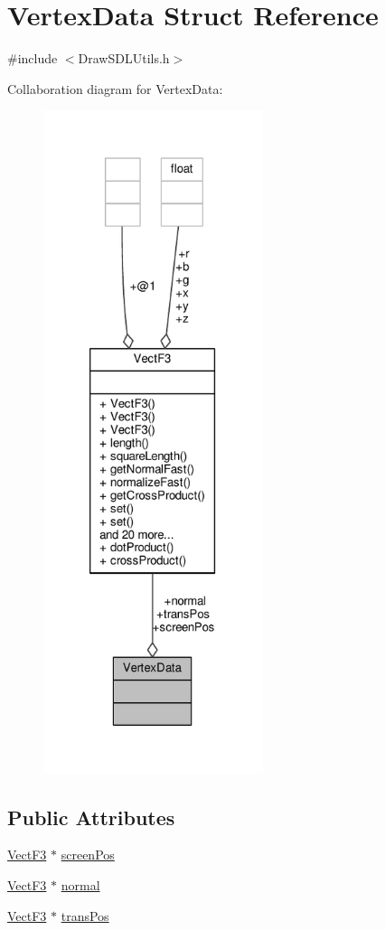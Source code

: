 \hypertarget{structVertexData}{\section{Vertex\-Data Struct Reference}
\label{structVertexData}
}


{\ttfamily \#include $<$Draw\-S\-D\-L\-Utils.\-h$>$}



Collaboration diagram for Vertex\-Data\-:
\nopagebreak
\begin{figure}[H]
\begin{center}
\leavevmode
\includegraphics[height=550pt]{structVertexData__coll__graph}
\end{center}
\end{figure}
\subsection*{Public Attributes}
\begin{DoxyCompactItemize}
\item 
\hyperlink{classVectF3}{Vect\-F3} $\ast$ \hyperlink{structVertexData_a78115f59b134cb53c0af1a0d834497e4}{screen\-Pos}
\item 
\hyperlink{classVectF3}{Vect\-F3} $\ast$ \hyperlink{structVertexData_a2f5a411c463380126b69d98267013dd6}{normal}
\item 
\hyperlink{classVectF3}{Vect\-F3} $\ast$ \hyperlink{structVertexData_a81b1a0a402d1efcea84d098dc1d391b4}{trans\-Pos}
\end{DoxyCompactItemize}


